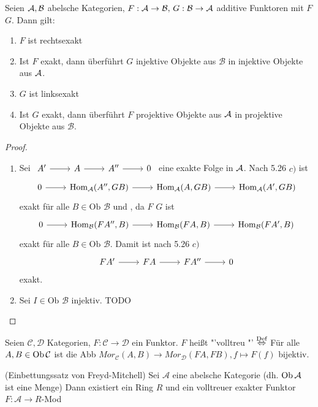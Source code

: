 \begin{sa}
	Seien $\mathcal{A}, \mathcal{B}$ abelsche Kategorien, $F:\mathcal{A} \to \mathcal{B}, \, G: \mathcal{B} \to \mathcal{A}$ additive Funktoren mit $F$  $G$. Dann gilt:
	\begin{enumerate}[label= \alph*)]
		\item $F$ ist rechtsexakt
		\item Ist $F$ exakt, dann überführt $G$ injektive Objekte aus $\mathcal{B}$ in injektive Objekte aus $\mathcal{A}$.
		\item $G$ ist linksexakt
		\item Ist $G$ exakt, dann überführt $F$ projektive Objekte aus $\mathcal{A}$ in projektive Objekte aus $\mathcal{B}$.
	\end{enumerate}
\end{sa}
\begin{proof}
	\begin{enumerate}[label= \alph*)]
		\item Sei $\begin{tikzcd}
		A' \arrow{r} & A \arrow{r} & A'' \arrow{r} & 0
		\end{tikzcd}$ eine exakte Folge in $\mathcal{A}$. Nach 5.26 $c)$ ist 
			$$\begin{tikzcd}
		0 \arrow{r}& \Hom_\A(A'', GB) \arrow{r} & \Hom_\A(A,GB) \arrow{r} & \Hom_\A(A',GB)
		\end{tikzcd}$$
		exakt für alle $B\in \text{Ob }\mathcal{B}$ und , da $F$   $G$ ist
		$$\begin{tikzcd}
		0 \arrow{r}& \Hom_\mathcal{B}(FA'', B) \arrow{r} & \Hom_\mathcal{B}(FA,B) \arrow{r} & \Hom_\mathcal{B}(FA',B)
		\end{tikzcd}$$
		exakt für alle $B\in \text{Ob }\mathcal{B}$. Damit ist nach 5.26 $c)$
		$$\begin{tikzcd}
		FA' \arrow{r} & FA \arrow{r} & FA'' \arrow{r} & 0
		\end{tikzcd}$$
		exakt.
		\item Sei $I\in \text{Ob } \mathcal{B}$ injektiv.
		 TODO
	\end{enumerate}
\end{proof}
\begin{df}
	Seien $\mathcal{C}, \mathcal{D} $ Kategorien, $F: \mathcal{C} \to \mathcal{D} $ ein Funktor. $F$ heißt "'volltreu "' $\overset{\text{Def}}{\Leftrightarrow} $ Für alle $A,B \in \text{Ob}\,\mathcal{C} $ ist die Abb $Mor_{\mathcal{C}}(A,B) \to Mor_{\mathcal{D}}(FA,FB), f \mapsto F(f) $ bijektiv.
\end{df}
\begin{sa}
	(Einbettungssatz von Freyd-Mitchell) Sei $\mathcal{A} $ eine abelsche Kategorie (dh. $\text{Ob}\,\mathcal{A}$ ist eine Menge) Dann existiert ein Ring $R$ und ein volltreuer exakter Funktor $F: \mathcal{A} \to R$-Mod 
\end{sa}
